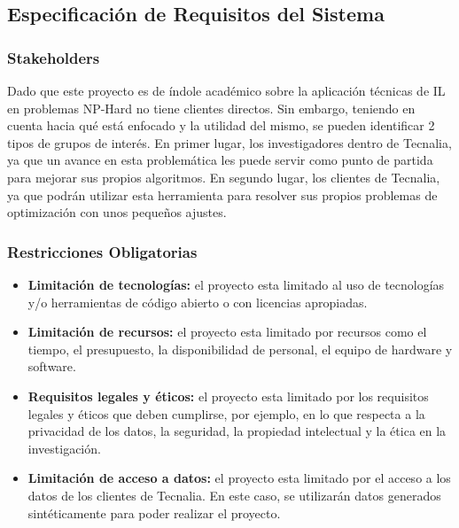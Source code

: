 \subsection{Especificación de Requisitos del Sistema}

\subsubsection{Stakeholders}
Dado que este proyecto es de índole académico sobre la aplicación
técnicas de IL en problemas NP-Hard no tiene clientes directos. Sin embargo, 
teniendo en cuenta hacia qué está enfocado y la utilidad del mismo, se pueden 
identificar 2 tipos de grupos de interés. En primer lugar, los investigadores 
dentro de Tecnalia, ya que un avance en esta problemática les puede servir como punto de partida
para mejorar sus propios algoritmos. En segundo lugar, los clientes de Tecnalia,
ya que podrán utilizar esta herramienta para resolver sus propios problemas de
optimización con unos pequeños ajustes.

\subsubsection{Restricciones Obligatorias}
\begin{itemize}
    \item \textbf{Limitación de tecnologías:} el proyecto esta limitado al uso de
    tecnologías y/o herramientas de código abierto o con licencias apropiadas.
    \item \textbf{Limitación de recursos:} el proyecto esta limitado 
    por recursos como el tiempo, el presupuesto, la disponibilidad de personal, 
    el equipo de hardware y software.
    \item \textbf{Requisitos legales y éticos:} el proyecto esta limitado 
    por los requisitos legales y éticos que deben cumplirse, por ejemplo, en lo 
    que respecta a la privacidad de los datos, la seguridad, la propiedad intelectual 
    y la ética en la investigación.
    \item \textbf{Limitación de acceso a datos:} el proyecto esta limitado
    por el acceso a los datos de los clientes de Tecnalia. En este caso, se
    utilizarán datos generados sintéticamente para poder realizar el proyecto.
\end{itemize}

